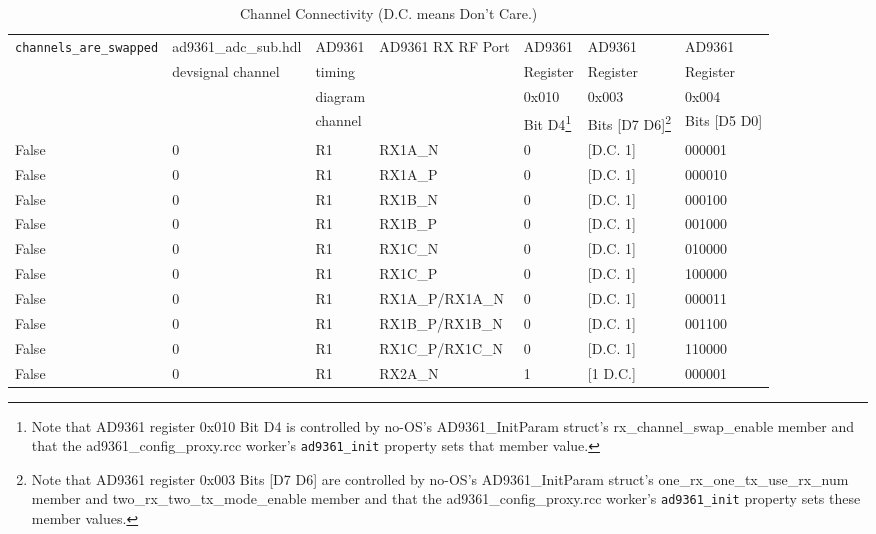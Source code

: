 \documentclass{article}
\def\comp{ad9361\_adc\_sub}
\begin{document}
\begin{landscape}

\begin{scriptsize}

	\centering

	\begin{longtable}{|p{4.5cm}|p{3.5cm}|p{1.5cm}|p{3.5cm}|p{1.75cm}|p{2.1cm}|p{2cm}|}
		\caption{Channel Connectivity (D.C. means Don't Care.)} \\
		\hline
		\rowcolor{blue}
		\verb+channels_are_swapped+& \comp.hdl & AD9361  & AD9361 RX RF Port & AD9361 & AD9361 & AD9361 \\
		\rowcolor{blue}
		& devsignal channel & timing &   & Register & Register & Register \\
		\rowcolor{blue}
		& & diagram & & 0x010 & 0x003 & 0x004 \\
		\rowcolor{blue}
		& & channel & & Bit D4\footnote{Note that AD9361 register 0x010 Bit D4 is controlled by no-OS's AD9361\_InitParam struct's rx\_channel\_swap\_enable member\cite{adi_ug570} and that the ad9361\_config\_proxy.rcc worker's \texttt{ad9361\_init} property sets that member value\cite{config_proxy_comp_datasheet}.} & Bits [D7 D6]\footnote{Note that AD9361 register 0x003 Bits [D7 D6] are controlled by no-OS's AD9361\_InitParam struct's one\_rx\_one\_tx\_use\_rx\_num member and two\_rx\_two\_tx\_mode\_enable member\cite{adi_ug570} and that the ad9361\_config\_proxy.rcc worker's \texttt{ad9361\_init} property sets these member values\cite{config_proxy_comp_datasheet}.} & Bits [D5 D0] \\
		\hline
		False & 0 & R1 & RX1A\_N         & 0 & [D.C. 1]  & 000001 \\
		False & 0 & R1 & RX1A\_P         & 0 & [D.C. 1]  & 000010 \\
		False & 0 & R1 & RX1B\_N         & 0 & [D.C. 1]  & 000100 \\
		False & 0 & R1 & RX1B\_P         & 0 & [D.C. 1]  & 001000 \\
		False & 0 & R1 & RX1C\_N         & 0 & [D.C. 1]  & 010000 \\
		False & 0 & R1 & RX1C\_P         & 0 & [D.C. 1]  & 100000 \\
		False & 0 & R1 & RX1A\_P/RX1A\_N & 0 & [D.C. 1]  & 000011 \\
		False & 0 & R1 & RX1B\_P/RX1B\_N & 0 & [D.C. 1]  & 001100 \\
		False & 0 & R1 & RX1C\_P/RX1C\_N & 0 & [D.C. 1]  & 110000 \\
		\hline
		False & 0 & R1 & RX2A\_N         & 1 & [1 D.C.] & 000001 \\

\end{longtable}
\end{scriptsize}
\end{landscape}
\end{document}
